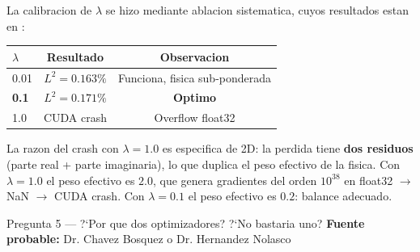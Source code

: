 \begin{answerbox}
La calibracion de $\lambda$ se hizo mediante ablacion sistematica, cuyos resultados
estan en :

\begin{center}
\begin{tabular}{@{}lcc@{}}
\toprule
$\lambda$ & Resultado & Observacion \\
\midrule
0.01 & $L^2 = 0.163\%$ & Funciona, fisica sub-ponderada \\
\textbf{0.1} & $L^2 = \mathbf{0.171\%}$ & \textbf{Optimo} \\
1.0 & CUDA crash & Overflow float32 \\
\bottomrule
\end{tabular}
\end{center}

La razon del crash con $\lambda = 1.0$ es especifica de 2D: la perdida tiene
\textbf{dos residuos} (parte real + parte imaginaria), lo que duplica el peso
efectivo de la fisica. Con $\lambda = 1.0$ el peso efectivo es $2.0$, que
genera gradientes del orden $10^{38}$ en float32 $\to$ NaN $\to$ CUDA crash.
Con $\lambda = 0.1$ el peso efectivo es $0.2$: balance adecuado.
\end{answerbox}

\vspace{8pt}

\begin{qabox}{Pregunta 5 --- ?`Por que dos optimizadores? ?`No bastaria uno?}
\textbf{Fuente probable:} Dr. Chavez Bosquez o Dr. Hernandez Nolasco
\end{qabox}

